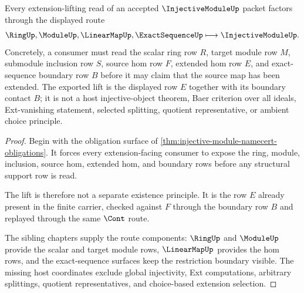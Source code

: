 \begin{theorem}
\label{thm:injective-module-extension-lifting}
Every extension-lifting read of an accepted $\InjectiveModuleUp$ packet factors through the displayed route
$$
\RingUp,\ModuleUp,\LinearMapUp,\ExactSequenceUp \longmapsto \InjectiveModuleUp .
$$
Concretely, a consumer must read the scalar ring row $R$, target module row $M$, submodule inclusion row $S$, source hom row $F$, extended hom row $E$, and exact-sequence boundary row $B$ before it may claim that the source map has been extended. The exported lift is the displayed row $E$ together with its boundary contact $B$; it is not a host injective-object theorem, Baer criterion over all ideals, Ext-vanishing statement, selected splitting, quotient representative, or ambient choice principle.
\end{theorem}
\begin{proof}
Begin with the obligation surface of \autoref{thm:injective-module-namecert-obligations}. It forces every extension-facing consumer to expose the ring, module, inclusion, source hom, extended hom, and boundary rows before any structural support row is read.

The lift is therefore not a separate existence principle. It is the row $E$ already present in the finite carrier, checked against $F$ through the boundary row $B$ and replayed through the same $\Cont$ route.

The sibling chapters supply the route components: $\RingUp$ and $\ModuleUp$ provide the scalar and target module rows, $\LinearMapUp$ provides the hom rows, and the exact-sequence surfaces keep the restriction boundary visible. The missing host coordinates exclude global injectivity, Ext computations, arbitrary splittings, quotient representatives, and choice-based extension selection.
\end{proof}


